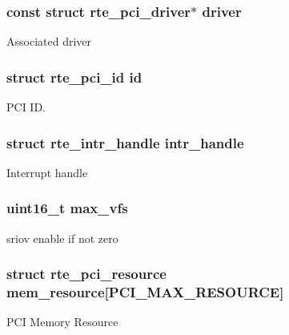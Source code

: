 \subsubsection[{driver}]{\setlength{\rightskip}{0pt plus 5cm}const struct {\bf rte\+\_\+pci\+\_\+driver}$\ast$ driver}\label{structrte__pci__device_a97c6c643faa744455604a9d0bd40ae4d}
Associated driver \hypertarget{structrte__pci__device_ac7befc4a21c72cd25fbf280ccbc0c74a}{}
\subsubsection[{id}]{\setlength{\rightskip}{0pt plus 5cm}struct {\bf rte\+\_\+pci\+\_\+id} id}\label{structrte__pci__device_ac7befc4a21c72cd25fbf280ccbc0c74a}
P\+C\+I I\+D. \hypertarget{structrte__pci__device_a84420c24119bbab092b9bb715278c0a2}{}
\subsubsection[{intr\+\_\+handle}]{\setlength{\rightskip}{0pt plus 5cm}struct rte\+\_\+intr\+\_\+handle intr\+\_\+handle}\label{structrte__pci__device_a84420c24119bbab092b9bb715278c0a2}
Interrupt handle \hypertarget{structrte__pci__device_a9e1ee240ce273f933ba2639bd751509b}{}
\subsubsection[{max\+\_\+vfs}]{\setlength{\rightskip}{0pt plus 5cm}uint16\+\_\+t max\+\_\+vfs}\label{structrte__pci__device_a9e1ee240ce273f933ba2639bd751509b}
sriov enable if not zero \hypertarget{structrte__pci__device_ae2869fca37eeec1d4c9054a857563394}{}
\subsubsection[{mem\+\_\+resource}]{\setlength{\rightskip}{0pt plus 5cm}struct {\bf rte\+\_\+pci\+\_\+resource} mem\+\_\+resource\mbox{[}{\bf P\+C\+I\+\_\+\+M\+A\+X\+\_\+\+R\+E\+S\+O\+U\+R\+C\+E}\mbox{]}}\label{structrte__pci__device_ae2869fca37eeec1d4c9054a857563394}
P\+C\+I Memory Resource \hypertarget{structrte__pci__device_ad090419c0eee32bef787f0b111ee679c}{}
